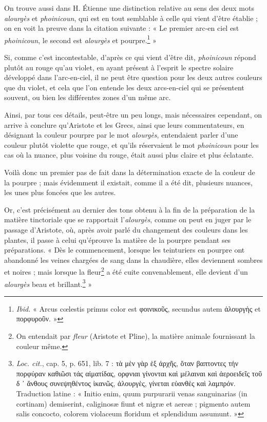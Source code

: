 \documentclass[a4paper, 11pt, oneside, polutonikogreek, french]{article}
\begin{document}
On trouve aussi dans H. Étienne une distinction relative au sens des deux mots \emph{alourgès} et \emph{phoinicoun}, qui est en tout semblable à celle qui vient d'être établie ; on en voit la preuve dans la citation suivante : « Le premier arc-en ciel est \emph{phoinicoun}, le second est \emph{alourgès} et pourpre.\footnote{\emph{Ibid.} « Arcus cœlestis primus color est φοινικοῦς, secundus autem ἁλουργὴς et πορφυροῦν. »} »

Si, comme c'est incontestable, d'après ce qui vient d'être dit, \emph{phoinicoun} répond plutôt au rouge qu'au violet, en ayant présent à l'esprit le spectre solaire développé dans l'arc-en-ciel, il ne peut être question pour les deux autres couleurs que du violet, et cela que l'on entende les deux arcs-en-ciel qui se présentent souvent, ou bien les différentes zones d'un même arc.

Ainsi, par tous ces détails, peut-être un peu longs, mais nécessaires cependant, on arrive à conclure qu'Aristote et les Grecs, ainsi que leurs commentateurs, en désignant la couleur pourpre par le mot \emph{alourgès}, entendaient parler d'une couleur plutôt violette que rouge, et qu'ils réservaient le mot \emph{phoinicoun} pour les cas où la nuance, plus voisine du rouge, était aussi plus claire et plus éclatante.

Voilà donc un premier pas de fait dans la détermination exacte de la couleur de la pourpre ; mais évidemment il existait, comme il a été dit, plusieurs nuances, les unes plus foncées que les autres.

Or, c'est précisément au dernier des tons obtenu à la fin de la préparation de la matière tinctoriale que se rapportait l'\emph{alourgès}, comme on peut en juger par le passage d'Aristote, où, après avoir parlé du changement des couleurs dans les plantes, il passe à celui qu'éprouve la matière de la pourpre pendant ses préparations. « Dès le commencement, lorsque les teinturiers en pourpre ont abandonné les veines chargées de sang dans la chaudière, elles deviennent sombres et noires ; mais lorsque la fleur\footnote{On entendait par \emph{fleur} (Aristote et Pline), la matière animale fournissant la couleur même.} a été cuite convenablement, elle devient d'un \emph{alourgès} beau et brillant.\footnote{\emph{Loc. cit.}, cap. 5, p. 651, lib. 7 : τὰ μὲν γὰρ ἑξ ἀρχῆς, ὅταν βαπτοντες τήν πορφύραν καθιῶσι τάς αἱματίδας, ορφνιαι γίνονται καὶ μέλαιναι καὶ ἀεροειδεῖς τοῦ δ ᾽ ἅνθους συνεψηθέντος ἱκανῶς, ἁλουργὲς, γίνεται εὐανθὲς καὶ λαμπρόν. Traduction latine : « Initio enim, quum purpurarii venas sanguinarias (in cortinam) demiserint, caliginosæ fiunt et nigræ et aereæ ; pigmento autem salis concocto, colorem violaceum floridum et splendidum assumunt. »} »
\end{document}
